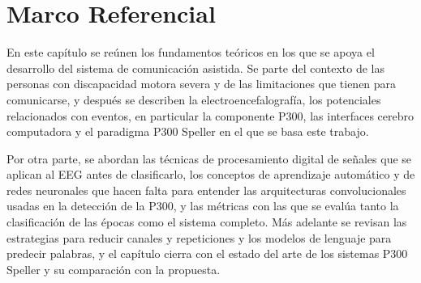\chapter[MARCO REFERENCIAL]{Marco Referencial}

En este capítulo se reúnen los fundamentos teóricos en los que se apoya el desarrollo del sistema
de comunicación asistida. Se parte del contexto de las personas con discapacidad motora severa y de
las limitaciones que tienen para comunicarse, y después se describen la electroencefalografía, los
potenciales relacionados con eventos, en particular la componente P300, las interfaces cerebro
computadora y el paradigma P300 Speller en el que se basa este trabajo.

Por otra parte, se abordan las técnicas de procesamiento digital de señales que se aplican al EEG
antes de clasificarlo, los conceptos de aprendizaje automático y de redes neuronales que hacen falta
para entender las arquitecturas convolucionales usadas en la detección de la P300, y las métricas
con las que se evalúa tanto la clasificación de las épocas como el sistema completo. Más adelante se
revisan las estrategias para reducir canales y repeticiones y los modelos de lenguaje para predecir
palabras, y el capítulo cierra con el estado del arte de los sistemas P300 Speller y su comparación
con la propuesta.














